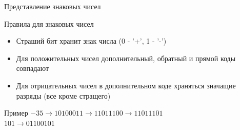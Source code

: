 \documentclass{beamer}
\begin{document}
    \begin{frame}{Представление знаковых чисел}
        \begin{block}{Правила для знаковых чисел}
            \begin{itemize}
                \item Страший бит хранит знак числа (0 - '+', 1 - '-')
                \item Для положительных чисел дополнительный, обратный и прямой коды совпадают
                \item Для отрицательных чисел в дополнительном коде храняться значащие разряды (все кроме стращего)
            \end{itemize}
        \end{block}
        \begin{block}{Пример}
        $-35 \to 10100011 \to 11011100 \to 11011101$ \\
        $ 101 \to 01100101$
        \end{block}
    \end{frame}
\end{document}
